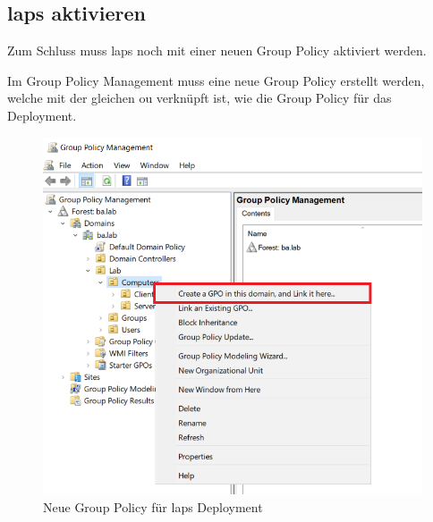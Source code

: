 \subsection{\acrshort{laps} aktivieren}
Zum Schluss muss \acrshort{laps} noch mit einer neuen Group Policy aktiviert werden.

Im Group Policy Management muss eine neue Group Policy erstellt werden, welche mit der gleichen \acrshort{ou} verknüpft ist, wie die Group Policy für das Deployment.
\begin{figure}[H]
    \centering
    \includegraphics[width=\linewidth]{../img/LAPS/GPO-Create-New.png}
    \caption{Neue Group Policy für \acrshort{laps} Deployment}
\end{figure}


